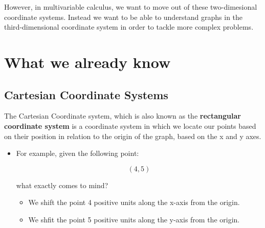 \documentclass{report}
\begin{document}
\begin{sloppypar}
\par However, in multivariable calculus, we
want to move out of these two-dimesional
coordinate systems. Instead we want to
be able to understand graphs in the
third-dimensional coordinate system in order
to tackle more complex problems.

\section{What we already know}
\subsection{Cartesian Coordinate Systems}
The Cartesian Coordinate system, which
is also known as the \textbf{rectangular
  coordinate system} is a
coordinate system in which we locate our
points based on their position in relation
to the origin of the graph, based on the
x and y axes.
\begin{itemize}

  \item For example, given the following point:

        \[ (4,5)\]

        what exactly comes to mind?
        \begin{itemize}
          \item We shift the point 4 positive
                units along the x-axis from
                the origin.
          \item We shfit the point 5
                positive units along the y-axis
                from the origin.

        \end{itemize}
\end{itemize}


\end{sloppypar}
\end{document}
